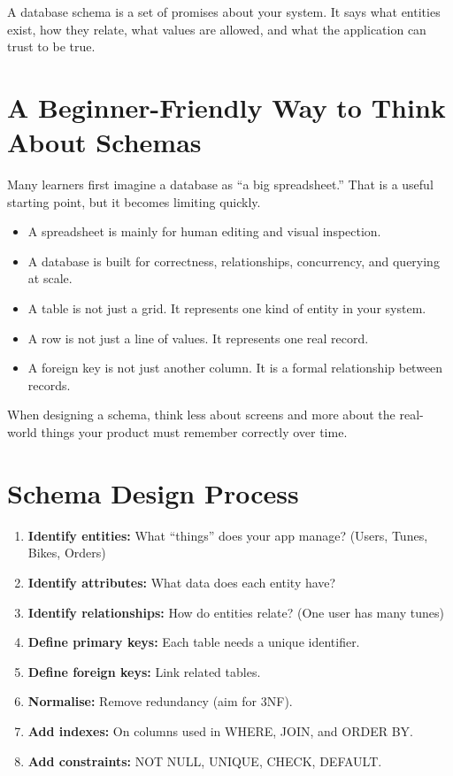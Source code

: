 \documentclass[12pt, a4paper, oneside]{book}
\begin{document}
\begin{intuitionbox}
A database schema is a set of promises about your system. It says what entities exist, how they relate, what values are allowed, and what the application can trust to be true.
\end{intuitionbox}

\section{A Beginner-Friendly Way to Think About Schemas}

Many learners first imagine a database as ``a big spreadsheet.'' That is a useful starting point, but it becomes limiting quickly.

\begin{itemize}[leftmargin=2em]
    \item A spreadsheet is mainly for human editing and visual inspection.
    \item A database is built for correctness, relationships, concurrency, and querying at scale.
    \item A table is not just a grid. It represents one kind of entity in your system.
    \item A row is not just a line of values. It represents one real record.
    \item A foreign key is not just another column. It is a formal relationship between records.
\end{itemize}

\begin{intuitionbox}
When designing a schema, think less about screens and more about the real-world things your product must remember correctly over time.
\end{intuitionbox}

\section{Schema Design Process}

\begin{enumerate}[leftmargin=2em]
    \item \textbf{Identify entities:} What ``things'' does your app manage? (Users, Tunes, Bikes, Orders)
    \item \textbf{Identify attributes:} What data does each entity have?
    \item \textbf{Identify relationships:} How do entities relate? (One user has many tunes)
    \item \textbf{Define primary keys:} Each table needs a unique identifier.
    \item \textbf{Define foreign keys:} Link related tables.
    \item \textbf{Normalise:} Remove redundancy (aim for 3NF).
    \item \textbf{Add indexes:} On columns used in WHERE, JOIN, and ORDER BY.
    \item \textbf{Add constraints:} NOT NULL, UNIQUE, CHECK, DEFAULT.
\end{enumerate}
\end{document}
